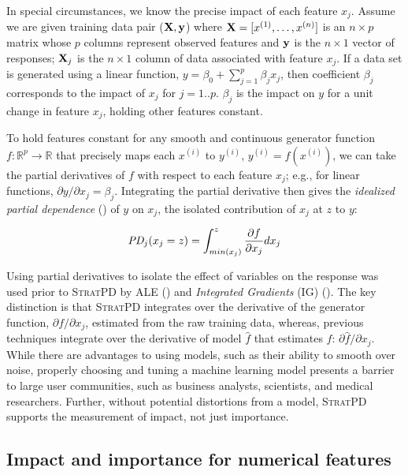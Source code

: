 \documentclass[11pt]{article}
\newcommand{\spd}{\fontfamily{cmr}\textsc{\small StratPD}}
\renewcommand{\xi}{x^{(i)}}
\begin{document}
In special circumstances, we know the precise impact of each feature $x_j$. Assume we are given training data pair ($\bf X, y$) where ${\bf X} = [x^{(1)}, \ldots, x^{(n)}]$ is an $n \times p$ matrix whose $p$ columns represent observed features and ${\bf y}$ is the $n \times 1$ vector of responses; ${\bf X}_j$ is the $n \times 1$ column of data associated with feature $x_j$.  If a data set is generated using a linear function, $y = \beta_0 + \sum_{j=1}^p \beta_j x_j$, then coefficient $\beta_j$ corresponds  to the impact of $x_j$ for $j=1..p$.  $\beta_j$ is the impact on $y$ for a unit change in feature $x_j$, holding other features constant.

To hold features constant for any smooth and continuous generator function $f:\mathbb{R}^{p} \rightarrow \mathbb{R}$ that precisely maps each $\xi$ to $y^{(i)}$, ${y^{(i)}} = f(\xi)$, we can take the partial derivatives of $f$ with respect to each feature $x_j$; e.g., for linear functions, ${\partial y}/{\partial x_j}=\beta_j$. Integrating the partial derivative then gives the {\em idealized partial dependence} (\citealt{stratpd}) of $y$ on $x_j$, the isolated contribution of $x_j$ at $z$ to $y$:

\begin{equation}\label{eq:pd}
\text{\it PD}_j(x_j = z) = \int_{min(x_j)}^z \frac{\partial f}{\partial x_j} dx_j
\end{equation}

Using partial derivatives to isolate the effect of variables on the response was used prior to \spd{} by ALE (\citealt{ALE}) and {\em Integrated Gradients} (IG) (\citealt{intgrad}). The key distinction is that  \spd{} integrates over the derivative of the generator function, ${\partial f}/{\partial x_j}$, estimated from the raw training data, whereas, previous techniques integrate over the derivative of model $\hat{f}$ that estimates $f$: ${\partial \hat{f}}/{\partial x_j}$. While there are advantages to using models, such as their ability to smooth over noise, properly choosing and tuning a machine learning model presents a barrier to large user communities, such as business analysts, scientists, and medical researchers. Further, without potential distortions from a model, \spd{} supports the measurement of impact, not just importance.

\subsection{Impact and importance for numerical features}
\end{document}
